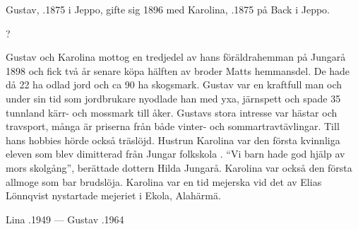 Gustav, .1875 i Jeppo, gifte sig 1896 med Karolina, .1875 på Back i Jeppo.
\begin{jhchildren}
  \item {}
  \item {}?
  \item {}
  \item {}
  \item {}
  \item {}
  \item {}
  \item {}
  \item {}
  \item {}
  \item {}
\end{jhchildren}
Gustav och Karolina mottog en tredjedel av hans föräldrahemman 	på Jungarå 1898 och fick två år senare köpa hälften av broder Matts 	hemmansdel. De hade då 22 ha odlad jord och ca 90 ha skogsmark. Gustav var en kraftfull man och under sin tid som jordbrukare nyodlade han med yxa, järnspett och spade 35 tunnland kärr- och mossmark till åker. Gustavs stora intresse var hästar och travsport, många är priserna från både vinter- och sommartravtävlingar. Till hans hobbies hörde också träslöjd. Hustrun Karolina var den första kvinnliga eleven som blev dimitterad från Jungar folkskola . ``Vi barn 	hade god hjälp av mors skolgång'', berättade dottern Hilda Jungarå. Karolina var också den första allmoge som bar brudslöja. Karolina var en tid mejerska vid det av Elias Lönnqvist nystartade mejeriet i Ekola, Alahärmä.

Lina .1949  ---  Gustav .1964


